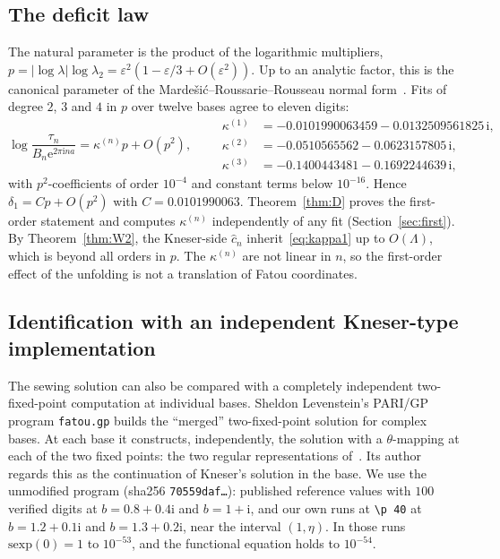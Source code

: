 \documentclass[11pt]{amsart}
\theoremstyle{definition}
\newcommand{\eee}{\mathrm{e}}
\newcommand{\ii}{\mathrm{i}}
\begin{document}
\subsection{The deficit law}\label{sec:deficit}
The natural parameter is the product of the logarithmic multipliers,
$p=|\log\lambda|\log\lambda_2=\varepsilon^2(1-\varepsilon/3+O(\varepsilon^2))$.  Up to an analytic
factor, this is the canonical parameter of the
Marde\v{s}i\'c--Roussarie--Rousseau normal form~\cite{MRR2004}.  Fits of degree
$2$, $3$ and $4$ in $p$ over twelve bases agree to eleven digits:
\begin{equation}\label{eq:kappa1}
 \log\frac{\tau_n}{B_n\eee^{2\pi\ii na}}=\kappa^{(n)}p+O(p^2),\qquad
 \begin{aligned}
 \kappa^{(1)}&=-0.0101990063459-0.0132509561825\,\ii,\\
 \kappa^{(2)}&=-0.0510565562-0.0623157805\,\ii,\\
 \kappa^{(3)}&=-0.1400443481-0.1692244639\,\ii,
 \end{aligned}
\end{equation}
with $p^2$-coefficients of order $10^{-4}$ and constant terms below
$10^{-16}$.  Hence $\delta_1=Cp+O(p^2)$ with $C=0.0101990063$.  Theorem~\ref{thm:D}
proves the first-order statement and computes $\kappa^{(n)}$ independently of any
fit (Section~\ref{sec:first}).  By
Theorem~\ref{thm:W2}, the Kneser-side $\hat c_n$ inherit~\eqref{eq:kappa1} up to
$O(\Lambda)$, which is beyond all orders in $p$.  The $\kappa^{(n)}$ are not linear
in $n$, so the first-order effect of the unfolding is not a translation of Fatou
coordinates.

\subsection{Identification with an independent Kneser-type implementation}\label{sec:fatou}
The sewing solution can also be compared with a completely independent
two-fixed-point computation at individual bases.  Sheldon Levenstein's PARI/GP
program \texttt{fatou.gp} builds the ``merged'' two-fixed-point solution for
complex bases.  At each base it constructs, independently, the solution with a
$\theta$-mapping at each of the two fixed points: the two regular representations
of~\cite[Prop.~1 and Lemma~1]{Paulsen2019}.  Its author regards this as the continuation of
Kneser's solution in the base.  We use the unmodified program
(sha256 \texttt{70559daf\ldots}): published reference values with $100$
verified digits at $b=0.8+0.4\ii$ and $b=1+\ii$, and our own runs at
\texttt{\textbackslash p 40} at $b=1.2+0.1\ii$ and $b=1.3+0.2\ii$, near the
interval $(1,\eta)$.  In those runs $\mathrm{sexp}(0)=1$ to $10^{-53}$, and the
functional equation holds to $10^{-54}$.
\end{document}
